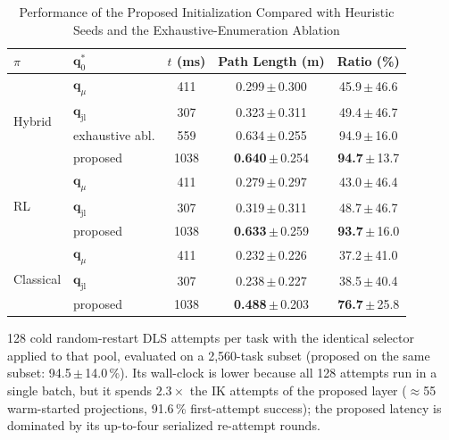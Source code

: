 \documentclass[journal]{IEEEtran}
\newcommand{\phSeedTime}{1038}      %
\begin{document}
\begin{table}[!t]
\caption{Performance of the Proposed Initialization Compared with
Heuristic Seeds and the Exhaustive-Enumeration Ablation}
\label{tab:seed}
\centering
\footnotesize
\begin{threeparttable}
\begin{tabular}{llccc}
\toprule
$\pi$ & $\mathbf{q}^{*}_{0}$ & $t$ (ms) & Path Length (m) &
Ratio (\%)\\
\midrule
\multirow{4}{*}{Hybrid}
 & $\mathbf{q}_{\mu}$ & 411 & 0.299\,$\pm$\,0.300 & 45.9\,$\pm$\,46.6\\
 & $\mathbf{q}_{\mathrm{jl}}$ & 307 & 0.323\,$\pm$\,0.311 & 49.4\,$\pm$\,46.7\\
 & exhaustive abl.\tnote{1} & 559 & 0.634\,$\pm$\,0.255 & 94.9\,$\pm$\,16.0\\
 & proposed & \phSeedTime & \textbf{0.640}\,$\pm$\,0.254 & \textbf{94.7}\,$\pm$\,13.7\\
\midrule
\multirow{3}{*}{RL}
 & $\mathbf{q}_{\mu}$ & 411 & 0.279\,$\pm$\,0.297 & 43.0\,$\pm$\,46.4\\
 & $\mathbf{q}_{\mathrm{jl}}$ & 307 & 0.319\,$\pm$\,0.311 & 48.7\,$\pm$\,46.7\\
 & proposed & \phSeedTime & \textbf{0.633}\,$\pm$\,0.259 & \textbf{93.7}\,$\pm$\,16.0\\
\midrule
\multirow{3}{*}{Classical}
 & $\mathbf{q}_{\mu}$ & 411 & 0.232\,$\pm$\,0.226 & 37.2\,$\pm$\,41.0\\
 & $\mathbf{q}_{\mathrm{jl}}$ & 307 & 0.238\,$\pm$\,0.227 & 38.5\,$\pm$\,40.4\\
 & proposed & \phSeedTime & \textbf{0.488}\,$\pm$\,0.203 & \textbf{76.7}\,$\pm$\,25.8\\
\bottomrule
\end{tabular}
\begin{tablenotes}
\item[1] 128 cold random-restart DLS attempts per task with the
identical selector applied to that pool, evaluated on a 2{,}560-task
subset (proposed on the same subset: 94.5\,$\pm$\,14.0\,\%). Its
wall-clock is lower because all 128 attempts run in a single batch,
but it spends $2.3\times$ the IK attempts of the proposed layer
($\approx$55 warm-started projections, 91.6\,\% first-attempt
success); the proposed latency is dominated by its up-to-four
serialized re-attempt rounds.
\end{tablenotes}
\end{threeparttable}
\end{table}
\end{document}
